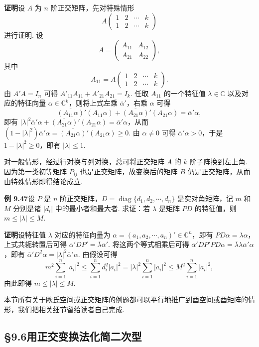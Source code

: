 \documentclass[UTF8,12pt,a4paper,fontset=fandol]{ctexart}
\begin{document}
\noindent\textbf{证明}\quad 设 $A$ 为 $n$ 阶正交矩阵，先对特殊情形
\[
A\begin{pmatrix}
1&2&\cdots&k\\
1&2&\cdots&k
\end{pmatrix}
\]
进行证明. 设
\[
A=\begin{pmatrix}
A_{11}&A_{12}\\
A_{21}&A_{22}
\end{pmatrix},
\]
其中
\[
A_{11}=A\begin{pmatrix}
1&2&\cdots&k\\
1&2&\cdots&k
\end{pmatrix}.
\]
由 $A'A=I_n$ 可得 $A'_{11}A_{11}+A'_{21}A_{21}=I_k$. 任取 $A_{11}$ 的一个特征值 $\lambda\in\mathbb{C}$ 以及对应的特征向量 $\alpha\in\mathbb{C}^k$，则将上式左乘 $\overline{\alpha}'$，右乘 $\alpha$ 可得
\[
\overline{(A_{11}\alpha)}'(A_{11}\alpha)+\overline{(A_{21}\alpha)}'(A_{21}\alpha)=\overline{\alpha}'\alpha,
\]
即有 $|\lambda|^2\overline{\alpha}'\alpha+\overline{(A_{21}\alpha)}'(A_{21}\alpha)=\overline{\alpha}'\alpha$，从而 $(1-|\lambda|^2)\overline{\alpha}'\alpha=\overline{(A_{21}\alpha)}'(A_{21}\alpha)\ge0$. 由 $\alpha\ne0$ 可得 $\overline{\alpha}'\alpha>0$，于是 $1-|\lambda|^2\ge0$，即有 $|\lambda|\le1$.

对一般情形，经过行对换与列对换，总可将正交矩阵 $A$ 的 $k$ 阶子阵换到左上角. 因为第一类初等矩阵 $P_{ij}$ 也是正交矩阵，故变换后的矩阵 $B$ 仍是正交矩阵，从而由特殊情形即得结论成立.

\noindent\textbf{例 9.47}\quad 设 $P$ 是 $n$ 阶正交矩阵，$D=\operatorname{diag}\{d_1,d_2,\cdots,d_n\}$ 是实对角矩阵，记 $m$ 和 $M$ 分别是诸 $|d_i|$ 中的最小者和最大者. 求证：若 $\lambda$ 是矩阵 $PD$ 的特征值，则 $m\le|\lambda|\le M$.

\noindent\textbf{证明}\quad 设特征值 $\lambda$ 对应的特征向量为 $\alpha=(a_1,a_2,\cdots,a_n)'\in\mathbb{C}^n$，即有 $PD\alpha=\lambda\alpha$，上式共轭转置后可得 $\overline{\alpha}'DP'=\overline{\lambda}\overline{\alpha}'$. 将这两个等式相乘后可得 $\overline{\alpha}'DP'PD\alpha=\overline{\lambda}\lambda\overline{\alpha}'\alpha$，即有 $\overline{\alpha}'D^2\alpha=|\lambda|^2\overline{\alpha}'\alpha$. 由假设可得
\[
m^2\sum_{i=1}^n|a_i|^2\le\sum_{i=1}^nd_i^2|a_i|^2=|\lambda|^2\sum_{i=1}^n|a_i|^2\le M^2\sum_{i=1}^n|a_i|^2,
\]
由此即得 $m\le|\lambda|\le M$.

本节所有关于欧氏空间或正交矩阵的例题都可以平行地推广到酉空间或酉矩阵的情形，我们把相关细节留给读者自己完成.

\subsection*{§9.6\quad 用正交变换法化简二次型}
\end{document}
